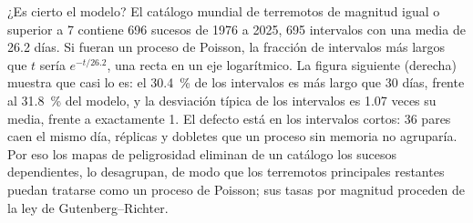 ¿Es cierto el modelo? El catálogo mundial de terremotos de magnitud igual o superior a 7 contiene 696 sucesos
de 1976 a 2025, 695 intervalos con una media de 26.2 días. Si fueran un proceso de Poisson,
la fracción de intervalos más largos que $t$ sería $e^{-t/26.2}$, una recta en un eje
logarítmico. La figura siguiente (derecha) muestra que casi lo es: el \qty{30.4}{\percent} de los intervalos es
más largo que 30 días, frente al \qty{31.8}{\percent} del modelo, y la desviación típica de los
intervalos es 1.07 veces su media, frente a exactamente 1. El defecto está en los intervalos cortos: 36 pares
caen el mismo día, réplicas y dobletes que un proceso sin memoria no agruparía. Por eso los mapas de
peligrosidad eliminan de un catálogo los sucesos dependientes, lo desagrupan, de modo que los
terremotos principales restantes puedan tratarse como un proceso de Poisson; sus tasas por magnitud proceden de la
ley de Gutenberg--Richter.

